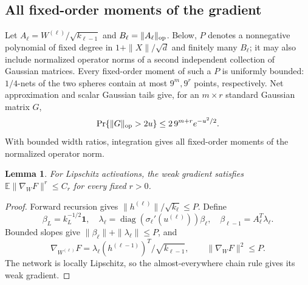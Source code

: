 \documentclass[a4paper]{tufte-handout}
\newtheorem{lemma}{Lemma}
\begin{document}
\begin{fullwidth}
\subsection{All fixed-order moments of the gradient}
Let $A_\ell=W^{(\ell)}/\sqrt{k_{\ell-1}}$ and $B_\ell=\|A_\ell\|_{\rm op}$. Below, $P$ denotes a nonnegative polynomial of fixed degree in $1+\|X\|/\sqrt d$ and finitely many $B_\ell$; it may also include normalized operator norms of a second independent collection of Gaussian matrices. Every fixed-order moment of such a $P$ is uniformly bounded: $1/4$-nets of the two spheres contain at most
$9^m,9^r$ points, respectively. Net approximation and scalar Gaussian tails give, for an $m\times r$ standard Gaussian matrix $G$,
\[
 \Pr\{\|G\|_{\rm op}>2u\}\le2\,9^{m+r}e^{-u^2/2}.
\]
With bounded width ratios, integration gives all fixed-order moments of the normalized operator norm.

\begin{lemma}\label{an:derivatives}
For Lipschitz activations, the weak gradient satisfies $\mathbb E\|\nabla_WF\|^r\le C_r$ for every fixed $r>0$.
\end{lemma}
\begin{proof}
Forward recursion gives $\|h^{(\ell)}\|/\sqrt{k_\ell}\le P$. Define
\[
 \beta_L=k_L^{-1/2}\boldsymbol1,\quad
 \lambda_\ell=\operatorname{diag}(\sigma_\ell'(u^{(\ell)}))\beta_\ell,\quad
 \beta_{\ell-1}=A_\ell^T\lambda_\ell.
\]
Bounded slopes give $\|\beta_\ell\|+\|\lambda_\ell\|\le P$, and
\[
 \nabla_{W^{(\ell)}}F=\lambda_\ell(h^{(\ell-1)})^T/\sqrt{k_{\ell-1}},
 \qquad \|\nabla_WF\|^2\le P. \tag{A3}\label{an:gradient}
\]
The network is locally Lipschitz, so the almost-everywhere chain rule gives its weak gradient.

\end{proof}

\end{fullwidth}
\end{document}
